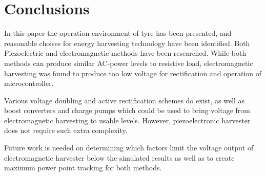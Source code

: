 \section{Conclusions}
In this paper the operation environment of tyre has been presented, and reasonable choises for energy harvesting technology have been identified. Both Piezoelectric and electromagnetic methods have been researched. While both methods can produce similar AC-power levels to resistive load, electromagnetic harvesting was found to produce too low voltage for rectification and operation of microcontroller. 

Various voltage doubling and active rectification schemes do exist, as well as boost converters and charge pumps which could be used to bring voltage from electromagnetic harvesting to usable levels. However, piezoelectronic harvester does not require such extra complexity. 

Future work is needed on determining which factors limit the voltage output of electromagnetic harvester below the simulated results as well as to create maximum power point tracking for both methods. 